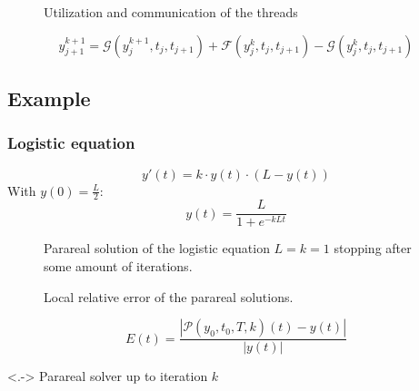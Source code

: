 
\begin{frame}
\begin{figure}[ht]
    \centering
    \caption{Utilization and communication of the threads}
    \label{fig:sequence}
\end{figure}
\begin{equation*}
y_{j+1}^{k+1} = \mathcal{G}\!\!\left(y_j^{k+1}, t_j, t_{j+1}\right) + \mathcal{F}\!\!\left(y_j^k, t_j, t_{j+1}\right) - \mathcal{G}\!\!\left(y_j^k, t_j, t_{j+1}\right)
\end{equation*}
\end{frame}

\subsection{Example}

\begin{frame}
\frametitle{Logistic equation}
\begin{equation*}
    y'(t) = k \cdot y(t) \cdot (L - y(t))
\end{equation*}
With \(y(0)= \frac{L}{2}\):
\begin{equation*}
    y(t) = \frac{L}{1+e^{-k L t}}
\end{equation*}
\end{frame}

\begin{frame}
    \begin{figure}[ht]
        \centering
        \scalebox{0.8}{}
        \caption{Parareal solution of the logistic equation \(L = k = 1\) stopping after some amount of iterations.}
        \label{fig:iters_log}
    \end{figure}
\end{frame}

\begin{frame}
    \begin{figure}[ht]
        \centering
        \scalebox{0.8}{}
        \caption{Local relative error of the parareal solutions.}
        \label{fig:iters_log}
    \end{figure}
    \begin{equation*}
        E(t) = \frac{\left|\mathcal{P}(y_0,t_0,T,k)(t)-y(t)\right|}{\left|y(t)\right|}
    \end{equation*}
    \begin{description}[]
        \item[\(\mathcal{P}\!\left(y, t_{A}, t_{\Omega}, k\right)\)]<.-> Parareal solver up to iteration \(k\)
    \end{description}
\end{frame}